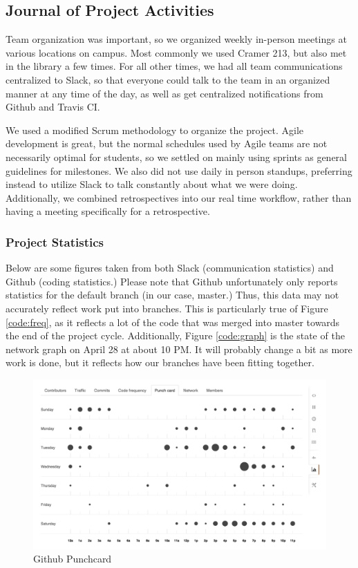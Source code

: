 \documentclass[12pt]{article}
\begin{document}
\subsection{Journal of Project Activities} %
Team organization was important, so we organized weekly in-person meetings at various locations on campus. Most commonly we used Cramer 213, but also met in the library a few times. For all other times, we had all team communications centralized to Slack, so that everyone could talk to the team in an organized manner at any time of the day, as well as get centralized notifications from Github and Travis CI.

We used a modified Scrum methodology to organize the project. Agile development is great, but the normal schedules used by Agile teams are not necessarily optimal for students, so we settled on mainly using sprints as general guidelines for milestones. We also did not use daily in person standups, preferring instead to utilize Slack to talk constantly about what we were doing. Additionally, we combined retrospectives into our real time workflow, rather than having a meeting specifically for a retrospective. 

\subsubsection{Project Statistics}
Below are some figures taken from both Slack (communication statistics) and Github (coding statistics.) Please note that Github unfortunately only reports statistics for the default branch (in our case, master.) Thus, this data may not accurately reflect work put into branches. This is particularly true of Figure \ref{code:freq}, as it reflects a lot of the code that was merged into master towards the end of the project cycle. Additionally, Figure \ref{code:graph} is the state of the network graph on April 28 at about 10 PM. It will probably change a bit as more work is done, but it reflects how our branches have been fitting together.

\begin{figure}[H]
        \centering
        \includegraphics[width=4.5in]{punchcard.png}
        \caption{Github Punchcard}
\end{figure}
\end{document}

